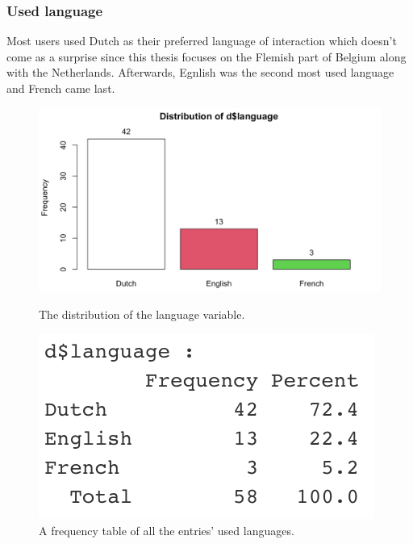 \subsubsection{Used language}
Most users used Dutch as their preferred language of interaction which doesn't come as a surprise since this thesis focuses on the Flemish part of Belgium along with the Netherlands. Afterwards, Egnlish was the second most used language and French came last.
\begin{figure}[!htb]
	\includegraphics[width=\linewidth]{../LaTeX/Figures/Environments/LanguagePlot.png}
	\caption{The distribution of the language variable.}\label{fig:languagePlot}
	\endminipage\hfill
	\includegraphics[width=\linewidth]{../LaTeX/Figures/Environments/LanguageFreq.png}
	\caption{A frequency table of all the entries' used languages.}\label{fig:languageFreq}
	\endminipage\hfill
\end{figure}

